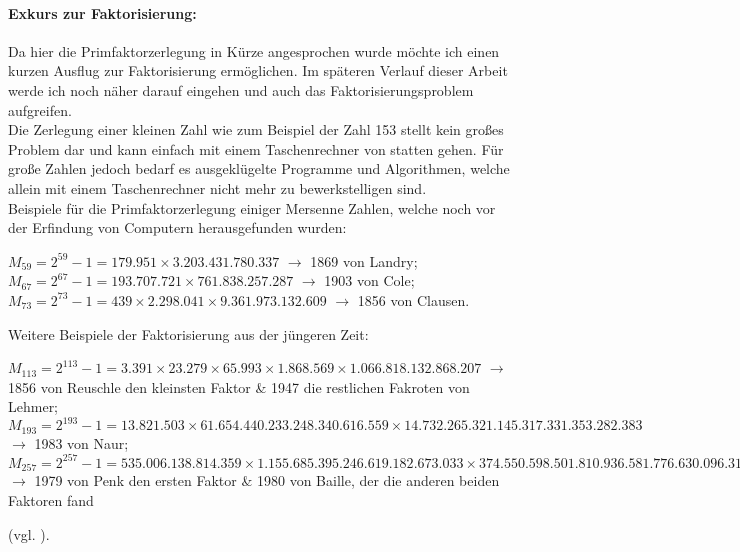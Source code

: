 \documentclass[german,12pt,a4paper]{article}
\begin{document}
\paragraph{Exkurs zur Faktorisierung:}Da hier die Primfaktorzerlegung in Kürze angesprochen wurde möchte ich einen kurzen Ausflug zur Faktorisierung ermöglichen.
Im späteren Verlauf dieser Arbeit werde ich noch näher darauf eingehen und auch das Faktorisierungsproblem aufgreifen.\\
Die Zerlegung einer kleinen Zahl wie zum Beispiel der Zahl 153 stellt kein großes Problem dar und kann einfach mit einem Taschenrechner von statten gehen.
Für große Zahlen jedoch bedarf es ausgeklügelte Programme und Algorithmen, welche allein mit einem Taschenrechner nicht mehr zu bewerkstelligen sind.\\
Beispiele für die Primfaktorzerlegung einiger Mersenne Zahlen, welche noch vor der Erfindung von Computern herausgefunden wurden:\
\begin{center}
$M_{59} = 2^{59}-1 = 179.951\times3.203.431.780.337$ $\rightarrow$ 1869 von Landry;\\
$M_{67} = 2^{67}-1 = 193.707.721\times761.838.257.287$ $\rightarrow$ 1903 von Cole;\\
$M_{73} = 2^{73}-1 = 439\times2.298.041\times9.361.973.132.609$ $\rightarrow$ 1856 von Clausen.\\
\end{center}
Weitere Beispiele der Faktorisierung aus der jüngeren Zeit:\
\begin{center}
$M_{113} = 2^{113}-1 = 3.391\times23.279\times65.993\times1.868.569\times1.066.818.132.868.207$ $\rightarrow$ 1856 von Reuschle den kleinsten Faktor \& 1947 die restlichen Fakroten von Lehmer;\\
$M_{193} = 2^{193}-1 = 13.821.503\times61.654.440.233.248.340.616.559\times14.732.265.321.145.317.331.353.282.383$ $\rightarrow$ 1983 von Naur;\\
$M_{257} = 2^{257}-1 = 535.006.138.814.359\times1.155.685.395.246.619.182.673.033\times374.550.598.501.810.936.581.776.630.096.313.181.393$ $\rightarrow$ 1979 von Penk den ersten Faktor \& 1980 von Baille, der die anderen beiden Faktoren fand\end{center} (vgl. \cite[125--128]{Ribenboim2006}).
\end{document}
